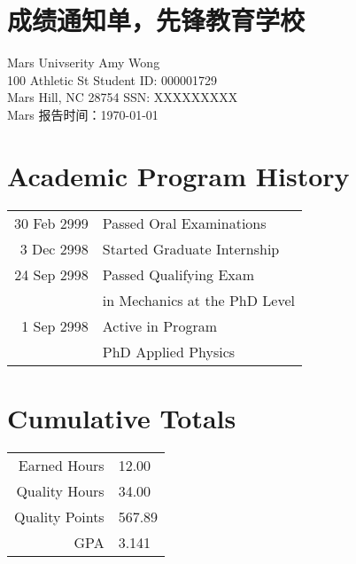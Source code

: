 \documentclass[10pt]{article}
\begin{document}
    \null\section*{\LARGE 成绩通知单，先锋教育学校}

    \vfill

    \begin{center}
        \begin{minipage}[c][40pt][c]{0.67\textwidth}
            Mars Univserity     \hfill Amy Wong              \\
            100 Athletic St     \hfill Student ID: 000001729 \\
            Mars Hill, NC 28754 \hfill SSN: XXXXXXXXX        \\
            Mars                \hfill 报告时间：\today
        \end{minipage}
    \end{center}

    \vfill

    \section*{Academic Program History}
    \begin{center}
        \begin{minipage}[c][60pt][c]{0.67\textwidth}\centering
        \begin{tabular}{r l}
            30 Feb 2999 & Passed Oral Examinations      \\
            3 Dec 2998 & Started Graduate Internship   \\
            24 Sep 2998 & Passed Qualifying Exam        \\
            & in Mechanics at the PhD Level \\
            1 Sep 2998 & Active in Program             \\
            & PhD Applied Physics
        \end{tabular}
        \end{minipage}
    \end{center}

    \vfill

    \section*{Cumulative Totals}
    \begin{minipage}[c]{1\textwidth}\centering
    \begin{tabular}{r l}
        Earned Hours   & 12.00  \\
        Quality Hours  & 34.00  \\
        Quality Points & 567.89 \\
        GPA            & 3.141  \\
    \end{tabular}
    \end{minipage}
\end{document}
